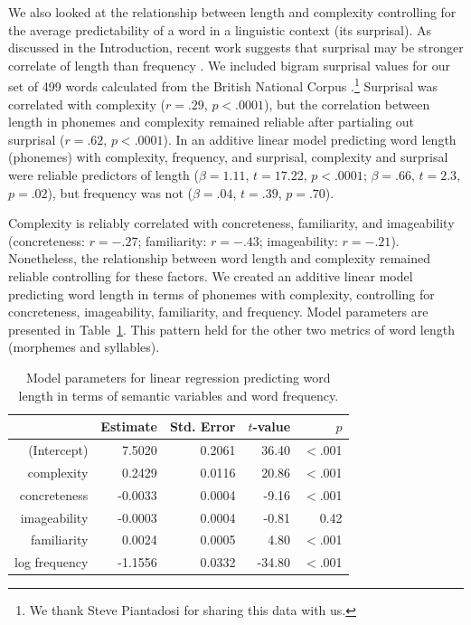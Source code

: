 \documentclass[man]{apa2}
\begin{document}
We also looked at the relationship between length and complexity controlling for the average predictability of a word in a linguistic context (its surprisal). As discussed in the Introduction, recent work suggests that surprisal may be stronger correlate of length than frequency \cite{piantadosi2011a}. We included bigram surprisal values for our set of 499 words calculated from the British National Corpus \cite{clear1993british}.\footnote{We thank Steve Piantadosi for sharing this data with us.} Surprisal was correlated with complexity ($r = .29$, $p < .0001$), but the correlation between length in phonemes and complexity remained reliable after partialing out surprisal ($r = .62$, $p < .0001$). In an additive linear model predicting word length (phonemes) with complexity, frequency, and surprisal, complexity and surprisal were reliable predictors of length ($\beta = 1.11$, $t = 17.22$, $p < .0001$; $\beta = .66$, $t = 2.3$, $p = .02$), but frequency was not ($\beta = .04$, $t = .39$, $p =. 70$).

Complexity is reliably correlated with concreteness, familiarity, and imageability (concreteness: $r = -.27$; familiarity: $r = -.43$; imageability: $r = -.21$). Nonetheless, the relationship between word length and complexity remained reliable controlling for these factors. We created an additive linear model predicting word length in terms of phonemes with complexity, controlling for concreteness, imageability, familiarity, and frequency. Model parameters are presented in Table~\ref{exp9model}. This pattern held for the other two metrics of word length (morphemes and syllables).

\begin{table}[t]
\centering
\begin{tabular}{rrrrr}
 \hline
 & Estimate & Std. Error & $t$-value & $p$ \\
 \hline
(Intercept) & 7.5020 & 0.2061 & 36.40 & $<$.001 \\
 complexity & 0.2429 & 0.0116 & 20.86 & $<$.001\\
  concreteness & -0.0033 & 0.0004 & -9.16 & $<$.001 \\
 imageability & -0.0003 & 0.0004 & -0.81 & 0.42 \\
  familiarity & 0.0024 & 0.0005 & 4.80 & $<$.001 \\
 log frequency & -1.1556 & 0.0332 & -34.80 & $<$.001 \\
  \hline
\end{tabular}
\caption{Model parameters for linear regression predicting word length in terms of semantic variables and word frequency.}
\label{exp9model}
\end{table}
\end{document}
